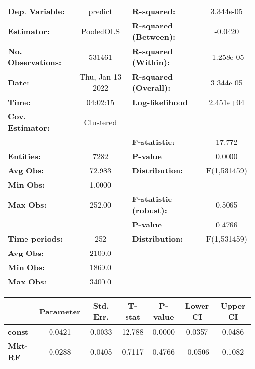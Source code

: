 \begin{center}
\begin{tabular}{lclc}
\toprule
\textbf{Dep. Variable:}    &      predict       & \textbf{  R-squared:         }   &    3.344e-05     \\
\textbf{Estimator:}        &     PooledOLS      & \textbf{  R-squared (Between):}  &     -0.0420      \\
\textbf{No. Observations:} &       531461       & \textbf{  R-squared (Within):}   &    -1.258e-05    \\
\textbf{Date:}             &  Thu, Jan 13 2022  & \textbf{  R-squared (Overall):}  &    3.344e-05     \\
\textbf{Time:}             &      04:02:15      & \textbf{  Log-likelihood     }   &    2.451e+04     \\
\textbf{Cov. Estimator:}   &     Clustered      & \textbf{                     }   &                  \\
\textbf{}                  &                    & \textbf{  F-statistic:       }   &      17.772      \\
\textbf{Entities:}         &        7282        & \textbf{  P-value            }   &      0.0000      \\
\textbf{Avg Obs:}          &       72.983       & \textbf{  Distribution:      }   &   F(1,531459)    \\
\textbf{Min Obs:}          &       1.0000       & \textbf{                     }   &                  \\
\textbf{Max Obs:}          &       252.00       & \textbf{  F-statistic (robust):} &      0.5065      \\
\textbf{}                  &                    & \textbf{  P-value            }   &      0.4766      \\
\textbf{Time periods:}     &        252         & \textbf{  Distribution:      }   &   F(1,531459)    \\
\textbf{Avg Obs:}          &       2109.0       & \textbf{                     }   &                  \\
\textbf{Min Obs:}          &       1869.0       & \textbf{                     }   &                  \\
\textbf{Max Obs:}          &       3400.0       & \textbf{                     }   &                  \\
\bottomrule
\end{tabular}
\begin{tabular}{lcccccc}
                & \textbf{Parameter} & \textbf{Std. Err.} & \textbf{T-stat} & \textbf{P-value} & \textbf{Lower CI} & \textbf{Upper CI}  \\
\midrule
\textbf{const}  &       0.0421       &       0.0033       &      12.788     &      0.0000      &       0.0357      &       0.0486       \\
\textbf{Mkt-RF} &       0.0288       &       0.0405       &      0.7117     &      0.4766      &      -0.0506      &       0.1082       \\
\bottomrule
\end{tabular}
\end{center}
